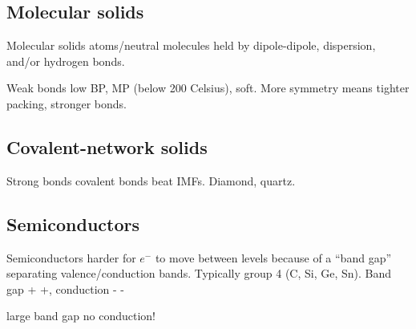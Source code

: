 \begin{mdframed}
\begin{multicols}{3}

    \subsection{Molecular solids}

\begin{compactdesc}
    \item[Molecular solids] atoms/neutral molecules held by dipole-dipole,
        dispersion, and/or hydrogen bonds.
    \item[Weak bonds] low BP, MP (below 200 Celsius), soft.
        More symmetry means tighter packing, stronger bonds.
\end{compactdesc}

    \subsection{Covalent-network solids}

\begin{compactdesc}
    \item[Strong bonds] covalent bonds beat IMFs. Diamond, quartz.
\end{compactdesc}

    \subsection{Semiconductors}

\begin{compactdesc}
    \item[Semiconductors] harder for $e^-$ to move between levels because of a
        ``band gap'' separating valence/conduction bands.
        Typically group 4 (C, Si, Ge, Sn). Band gap + +, conduction - -
    \item[large band gap] no conduction!
\end{compactdesc}


\end{multicols}
\end{mdframed}



